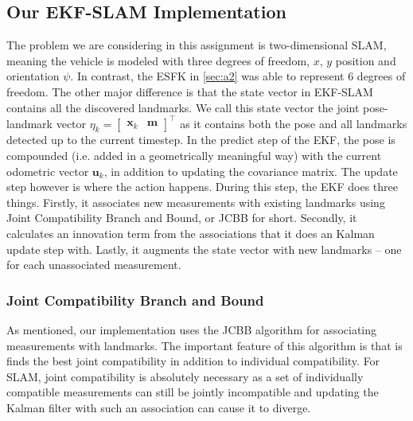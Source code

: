 \subsection{Our EKF-SLAM Implementation}
The problem we are considering in this assignment is two-dimensional SLAM, meaning the vehicle is modeled with three degrees of freedom, $x$, $y$ position and orientation $\psi$. In contrast, the ESFK in \ref{sec:a2} was able to represent 6 degrees of freedom. The other major difference is that the state vector in EKF-SLAM contains all the discovered landmarks. We call this state vector the joint pose-landmark vector $\eta_k = \begin{bmatrix} \mathbf{x}_k & \mathbf{m} \end{bmatrix}^{\top}$ as it contains both the pose and all landmarks detected up to the current timestep. In the predict step of the EKF, the pose is compounded (i.e. added in a geometrically meaningful way) with the current odometric vector $\mathbf{u}_k$, in addition to updating the covariance matrix. The update step however is where the action happens. During this step, the EKF does three things. Firstly, it associates new measurements with existing landmarks using Joint Compatibility Branch and Bound, or JCBB for short. Secondly, it calculates an innovation term from the associations that it does an Kalman update step with. Lastly, it augments the state vector with new landmarks – one for each unassociated measurement.

\subsubsection{Joint Compatibility Branch and Bound}
As mentioned, our implementation uses the JCBB algorithm for associating measurements with landmarks. The important feature of this algorithm is that is finds the best joint compatibility in addition to individual compatibility. For SLAM, joint compatibility is absolutely necessary as a set of individually compatible measurements can still be jointly incompatible and updating the Kalman filter with such an association can cause it to diverge.\cite{jcbb}






